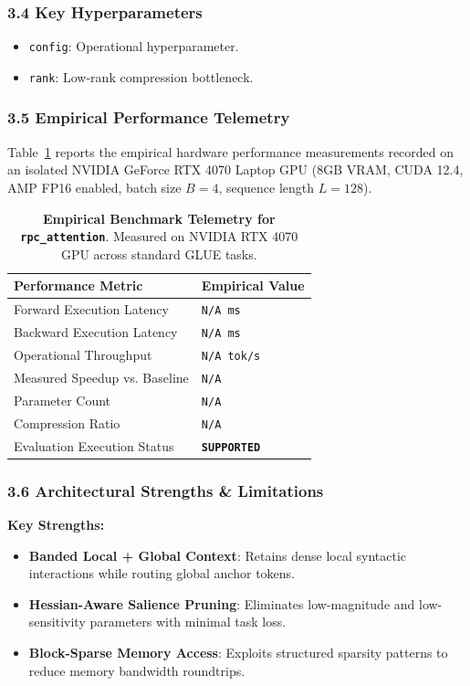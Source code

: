 \subsubsection*{3.4 Key Hyperparameters}
\begin{itemize}
    \item \texttt{config}: Operational hyperparameter.
    \item \texttt{rank}: Low-rank compression bottleneck.
\end{itemize}

\subsubsection*{3.5 Empirical Performance Telemetry}
Table~\ref{tab:telemetry_rpc\_attention} reports the empirical hardware performance measurements recorded on an isolated NVIDIA GeForce RTX 4070 Laptop GPU (8GB VRAM, CUDA 12.4, AMP FP16 enabled, batch size $B=4$, sequence length $L=128$).

\begin{table}[h]
\centering
\small
\caption{\textbf{Empirical Benchmark Telemetry for \texttt{rpc\_attention}}. Measured on NVIDIA RTX 4070 GPU across standard GLUE tasks.}
\label{tab:telemetry_rpc\_attention}
\begin{tabularx}{\columnwidth}{lX}
\toprule
\textbf{Performance Metric} & \textbf{Empirical Value} \\
\midrule
Forward Execution Latency & \texttt{N/A ms} \\
Backward Execution Latency & \texttt{N/A ms} \\
Operational Throughput & \texttt{N/A tok/s} \\
Measured Speedup vs. Baseline & \texttt{N/A} \\
Parameter Count & \texttt{N/A} \\
Compression Ratio & \texttt{N/A} \\
Evaluation Execution Status & \textbf{\texttt{SUPPORTED}} \\
\bottomrule
\end{tabularx}
\end{table}

\subsubsection*{3.6 Architectural Strengths \& Limitations}
\textbf{Key Strengths:}
\begin{itemize}
    \item \textbf{Banded Local + Global Context}: Retains dense local syntactic interactions while routing global anchor tokens.
    \item \textbf{Hessian-Aware Salience Pruning}: Eliminates low-magnitude and low-sensitivity parameters with minimal task loss.
    \item \textbf{Block-Sparse Memory Access}: Exploits structured sparsity patterns to reduce memory bandwidth roundtrips.
\end{itemize}

